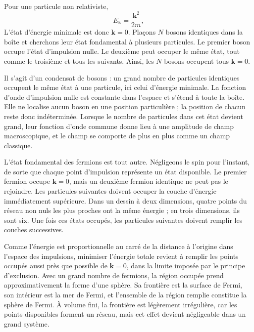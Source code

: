 Pour une particule non relativiste,
\begin{equation}
E_{\mathbf{k}}=\frac{\mathbf{k}^2}{2m},
\end{equation}
L’état d’énergie minimale est donc \(\mathbf{k}=0\). Plaçons \(N\) bosons identiques dans la boîte et cherchons leur état fondamental à plusieurs particules. Le premier boson occupe l’état d’impulsion nulle. Le deuxième peut occuper le même état, tout comme le troisième et tous les suivants. Ainsi, les \(N\) bosons occupent tous \(\mathbf{k}=0\).

Il s’agit d’un condensat de bosons : un grand nombre de particules identiques occupent le même état à une particule, ici celui d’énergie minimale. La fonction d’onde d’impulsion nulle est constante dans l’espace et s’étend à toute la boîte. Elle ne localise aucun boson en une position particulière ; la position de chacun reste donc indéterminée. Lorsque le nombre de particules dans cet état devient grand, leur fonction d’onde commune donne lieu à une amplitude de champ macroscopique, et le champ se comporte de plus en plus comme un champ classique.

L’état fondamental des fermions est tout autre. Négligeons le spin pour l’instant, de sorte que chaque point d’impulsion représente un état disponible. Le premier fermion occupe \(\mathbf{k}=0\), mais un deuxième fermion identique ne peut pas le rejoindre. Les particules suivantes doivent occuper la couche d’énergie immédiatement supérieure. Dans un dessin à deux dimensions, quatre points du réseau non nuls les plus proches ont la même énergie ; en trois dimensions, ils sont six. Une fois ces états occupés, les particules suivantes doivent remplir les couches successives.

Comme l’énergie est proportionnelle au carré de la distance à l’origine dans l’espace des impulsions, minimiser l’énergie totale revient à remplir les points occupés aussi près que possible de \(\mathbf{k}=0\), dans la limite imposée par le principe d’exclusion. Avec un grand nombre de fermions, la région occupée prend approximativement la forme d’une sphère. Sa frontière est la surface de Fermi, son intérieur est la mer de Fermi, et l’ensemble de la région remplie constitue la sphère de Fermi. À volume fini, la frontière est légèrement irrégulière, car les points disponibles forment un réseau, mais cet effet devient négligeable dans un grand système.

